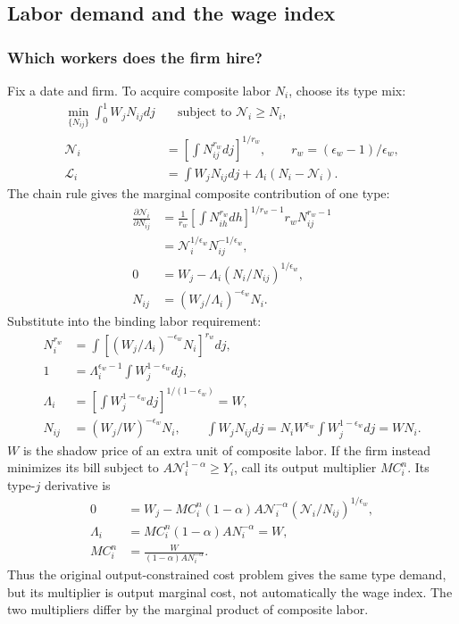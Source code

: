 \subsection{Labor demand and the wage index}

\subsubsection{Which workers does the firm hire?}

Fix a date and firm. To acquire composite labor $N_i$, choose its type mix:
\begin{align}
 \min_{\{N_{ij}\}}\int_0^1W_jN_{ij}dj
 &\quad\text{subject to }\mathcal N_i\geq N_i,\\
 \mathcal N_i&=\left[\int N_{ij}^{r_w}dj\right]^{1/r_w},
 \qquad r_w=(\epsilon_w-1)/\epsilon_w,\\
 \mathcal L_i&=\int W_jN_{ij}dj+\Lambda_i(N_i-\mathcal N_i).
\end{align}
The chain rule gives the marginal composite contribution of one type:
\begin{align}
 \frac{\partial\mathcal N_i}{\partial N_{ij}}
 &=\frac1{r_w}\left[\int N_{ih}^{r_w}dh\right]^{1/r_w-1}
                                  r_wN_{ij}^{r_w-1}\\
 &=\mathcal N_i^{1/\epsilon_w}N_{ij}^{-1/\epsilon_w},\\
 0&=W_j-\Lambda_i(N_i/N_{ij})^{1/\epsilon_w},\\
 N_{ij}&=(W_j/\Lambda_i)^{-\epsilon_w}N_i.
\end{align}
Substitute into the binding labor requirement:
\begin{align}
 N_i^{r_w}&=\int[(W_j/\Lambda_i)^{-\epsilon_w}N_i]^{r_w}dj,\\
 1&=\Lambda_i^{\epsilon_w-1}\int W_j^{1-\epsilon_w}dj,\\
 \Lambda_i&=\left[\int W_j^{1-\epsilon_w}dj\right]^{1/(1-\epsilon_w)}=W,\\
 N_{ij}&=(W_j/W)^{-\epsilon_w}N_i,\qquad
 \int W_jN_{ij}dj=N_iW^{\epsilon_w}\int W_j^{1-\epsilon_w}dj=WN_i.
 \label{eq:sw-type-demand}
\end{align}
$W$ is the shadow price of an extra unit of composite labor. If the firm
instead minimizes its bill subject to
$A\mathcal N_i^{1-\alpha}\geq Y_i$, call its output multiplier $MC_i^n$.
Its type-$j$ derivative is
\begin{align}
 0&=W_j-MC_i^n(1-\alpha)A\mathcal N_i^{-\alpha}
                         (\mathcal N_i/N_{ij})^{1/\epsilon_w},\\
 \Lambda_i&=MC_i^n(1-\alpha)AN_i^{-\alpha}=W,\\
 MC_i^n&=\frac{W}{(1-\alpha)AN_i^{-\alpha}}.
\end{align}
Thus the original output-constrained cost problem gives the same type demand,
but its multiplier is output marginal cost, not automatically the wage index.
The two multipliers differ by the marginal product of composite labor.

